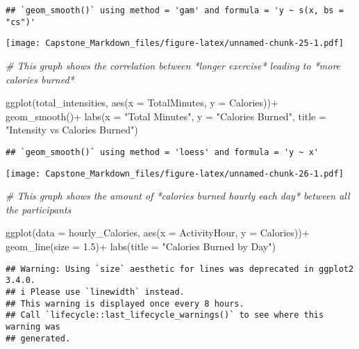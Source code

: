 \documentclass[
]{article}
\newenvironment{Shaded}{\begin{snugshade}}{\end{snugshade}}
\newcommand{\AttributeTok}[1]{\textcolor[rgb]{0.77,0.63,0.00}{#1}}
\newcommand{\CommentTok}[1]{\textcolor[rgb]{0.56,0.35,0.01}{\textit{#1}}}
\newcommand{\FloatTok}[1]{\textcolor[rgb]{0.00,0.00,0.81}{#1}}
\newcommand{\FunctionTok}[1]{\textcolor[rgb]{0.00,0.00,0.00}{#1}}
\newcommand{\NormalTok}[1]{#1}
\newcommand{\SpecialCharTok}[1]{\textcolor[rgb]{0.00,0.00,0.00}{#1}}
\newcommand{\StringTok}[1]{\textcolor[rgb]{0.31,0.60,0.02}{#1}}
\begin{document}
\begin{verbatim}
## `geom_smooth()` using method = 'gam' and formula = 'y ~ s(x, bs = "cs")'
\end{verbatim}

\texttt{[image: Capstone\_Markdown\_files/figure-latex/unnamed-chunk-25-1.pdf]}

\begin{Shaded}
\begin{Highlighting}[]
\CommentTok{\# This graph shows the correlation between *longer exercise* leading to *more calories burned* }

\FunctionTok{ggplot}\NormalTok{(total\_intensities, }\FunctionTok{aes}\NormalTok{(}\AttributeTok{x =}\NormalTok{ TotalMinutes, }\AttributeTok{y =}\NormalTok{ Calories))}\SpecialCharTok{+}
  \FunctionTok{geom\_smooth}\NormalTok{()}\SpecialCharTok{+}
  \FunctionTok{labs}\NormalTok{(}\AttributeTok{x =} \StringTok{"Total Minutes"}\NormalTok{, }\AttributeTok{y =} \StringTok{"Calories Burned"}\NormalTok{, }\AttributeTok{title =} \StringTok{"Intensity vs Calories Burned"}\NormalTok{)}
\end{Highlighting}
\end{Shaded}

\begin{verbatim}
## `geom_smooth()` using method = 'loess' and formula = 'y ~ x'
\end{verbatim}

\texttt{[image: Capstone\_Markdown\_files/figure-latex/unnamed-chunk-26-1.pdf]}

\begin{Shaded}
\begin{Highlighting}[]
\CommentTok{\# This graph shows the amount of *calories burned hourly each day* between all the participants }

\FunctionTok{ggplot}\NormalTok{(}\AttributeTok{data =}\NormalTok{ hourly\_Calories, }\FunctionTok{aes}\NormalTok{(}\AttributeTok{x =}\NormalTok{ ActivityHour, }\AttributeTok{y =}\NormalTok{ Calories))}\SpecialCharTok{+}
  \FunctionTok{geom\_line}\NormalTok{(}\AttributeTok{size =} \FloatTok{1.5}\NormalTok{)}\SpecialCharTok{+}
  \FunctionTok{labs}\NormalTok{(}\AttributeTok{title =} \StringTok{"Calories Burned by Day"}\NormalTok{)}
\end{Highlighting}
\end{Shaded}

\begin{verbatim}
## Warning: Using `size` aesthetic for lines was deprecated in ggplot2 3.4.0.
## i Please use `linewidth` instead.
## This warning is displayed once every 8 hours.
## Call `lifecycle::last_lifecycle_warnings()` to see where this warning was
## generated.
\end{verbatim}
\end{document}
